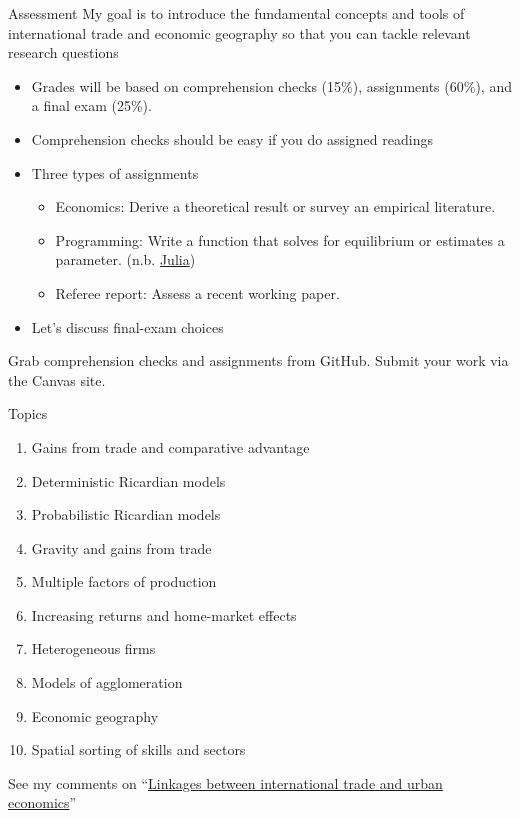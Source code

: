 \documentclass[10pt,notes=hide]{beamer}
\begin{document}
\begin{frame}{Assessment}
My goal is to introduce the fundamental concepts and tools of international trade and economic geography so that you can tackle relevant research questions
\begin{itemize}
\item Grades will be based on comprehension checks (15\%), assignments (60\%), and a final exam (25\%).
\item Comprehension checks should be easy if you do assigned readings
\item Three types of assignments
\begin{itemize}
\item Economics: Derive a theoretical result or survey an empirical literature.
\item Programming: Write a function that solves for equilibrium or estimates a parameter. (n.b. \href{https://tradediversion.net/2018/09/17/why-i-encourage-econ-phd-students-to-learn-julia/}{Julia})
\item Referee report: Assess a recent working paper.
\end{itemize}
\item Let's discuss final-exam choices
\end{itemize}
Grab comprehension checks and assignments from GitHub.
Submit your work via the Canvas site.
\end{frame}
\begin{frame}{Topics}
\begin{enumerate}
\item Gains from trade and comparative advantage
\item Deterministic Ricardian models
\item Probabilistic Ricardian models
\item Gravity and gains from trade
\item Multiple factors of production
\item Increasing returns and home-market effects
\item Heterogeneous firms
\item Models of agglomeration
\item Economic geography
\item Spatial sorting of skills and sectors
\end{enumerate}
See my comments on ``\href{https://tradediversion.net/2017/09/17/linkages-between-international-trade-and-urban-economics/}{Linkages between international trade and urban economics}''
\end{frame}
\end{document}

